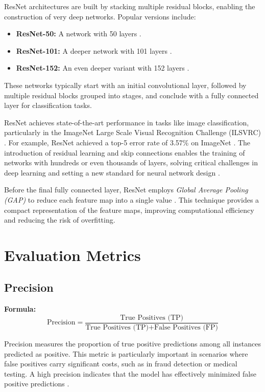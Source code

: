 ResNet architectures are built by stacking multiple residual blocks, enabling the construction of very deep networks. Popular versions include:
\begin{itemize}
    \item \textbf{ResNet-50:} A network with 50 layers \cite{he2015deepresiduallearningimage}.
    \item \textbf{ResNet-101:} A deeper network with 101 layers \cite{he2015deepresiduallearningimage}.
    \item \textbf{ResNet-152:} An even deeper variant with 152 layers \cite{he2015deepresiduallearningimage}.
\end{itemize}
These networks typically start with an initial convolutional layer, followed by multiple residual blocks grouped into stages, and conclude with a fully connected layer for classification tasks.

ResNet achieves state-of-the-art performance in tasks like image classification, particularly in the ImageNet Large Scale Visual Recognition Challenge (ILSVRC) \cite{he2015deepresiduallearningimage}. For example, ResNet achieved a top-5 error rate of 3.57\% on ImageNet \cite{he2015deepresiduallearningimage}. The introduction of residual learning and skip connections enables the training of networks with hundreds or even thousands of layers, solving critical challenges in deep learning and setting a new standard for neural network design \cite{he2015deepresiduallearningimage}.


Before the final fully connected layer, ResNet employs \textit{Global Average Pooling (GAP)} to reduce each feature map into a single value \cite{he2015deepresiduallearningimage}. This technique provides a compact representation of the feature maps, improving computational efficiency and reducing the risk of overfitting.



\section*{Evaluation Metrics}
\subsection*{Precision}
\textbf{Formula:}
\[
\text{Precision} = \frac{\text{True Positives (TP)}}{\text{True Positives (TP)} + \text{False Positives (FP)}}
\]

Precision measures the proportion of true positive predictions among all instances predicted as positive. This metric is particularly important in scenarios where false positives carry significant costs, such as in fraud detection or medical testing. A high precision indicates that the model has effectively minimized false positive predictions \cite{hossin2015review}.

